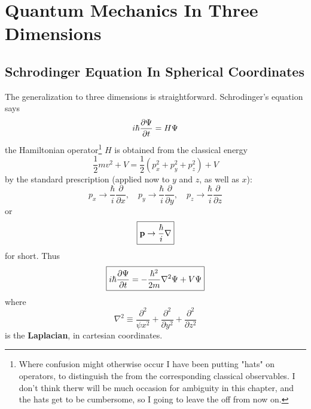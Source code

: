 \chapter{Quantum Mechanics In Three Dimensions}
\section{Schrodinger Equation In Spherical Coordinates}
The generalization to three dimensions is straightforward. Schrodinger's equation says
\begin{equation}\label{4.1}
	i\hbar\pdv{\Psi}{t}=H\Psi
\end{equation}
the Hamiltonian operator\footnote{Where confusion might otherwise occur I have been putting "hats" on operators, to distinguish the from the corresponding classical observables. I don't think therw will be much occasion for ambiguity in this chapter, and the hats get to be cumbersome, so I going to leave the off from now on.} $H$ is obtained from the classical energy $$\frac{1}{2}mv^2+V=\frac{1}{2}(p_x^2+p_y^2+p_z^2)+V$$ by the standard prescription (applied now to $y$ and $z$, as well as $x$):
\begin{equation}\label{4.2}
	p_x\to\frac{\hbar}{i}\frac{\partial}{\partial x},\quad p_y\to\frac{\hbar}{i}\frac{\partial}{\partial y},\quad p_z\to\frac{\hbar}{i}\frac{\partial}{\partial z}
\end{equation}
or
\begin{equation}\label{4.3}
	\boxed{\vb{p}\to\frac{\hbar}{i}\nabla}
\end{equation}
for short. Thus
\begin{equation}\label{4.4}
	\boxed{i\hbar\pdv{\Psi}{t}=-\frac{\hbar^2}{2m}\nabla^2\Psi + V\Psi}
\end{equation}
where
\begin{equation}\label{4.5}
	\nabla^2\equiv \frac{\partial^2}{\psi x^2} + \frac{\partial^2}{\partial y^2} + \frac{\partial^2}{\partial z^2}
\end{equation}
is the \textbf{Laplacian}, in cartesian coordinates.

